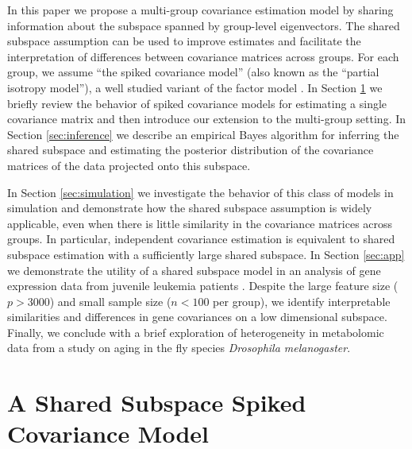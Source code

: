 \documentclass[12pt]{article}
\begin{document}
In this paper we propose a multi-group covariance estimation model by
sharing information about the subspace spanned by group-level
eigenvectors.  The shared subspace assumption can be used to improve
estimates and facilitate the interpretation of differences between
covariance matrices across groups.  For each group, we assume ``the
spiked covariance model'' (also known as the ``partial isotropy
model''), a well studied variant of the factor model
\citep{Mardia1980, Johnstone2001}.  In Section \ref{sec:shared} we
briefly review the behavior of spiked covariance models for estimating
a single covariance matrix and then introduce our extension to the
multi-group setting.  In Section \ref{sec:inference} we describe an
empirical Bayes algorithm for inferring the shared subspace and
estimating the posterior distribution of the covariance matrices of
the data projected onto this subspace.  

In Section \ref{sec:simulation} we investigate the behavior of this
class of models in simulation and demonstrate how the shared subspace
assumption is widely applicable, even when there is little similarity
in the covariance matrices across groups.  In particular, independent
covariance estimation is equivalent to shared subspace
estimation with a sufficiently large shared subspace.  In Section
\ref{sec:app} we demonstrate the utility of a shared subspace model in
an analysis of gene expression data from juvenile leukemia patients .
Despite the large feature size ($p > 3000$) and small sample size
($n < 100$ per group), we identify interpretable similarities and
differences in gene covariances on a low dimensional subspace.
Finally, we conclude with a brief exploration of heterogeneity in
metabolomic data from a study on aging in the fly species
\textit{Drosophila melanogaster}.

\section{A Shared Subspace Spiked Covariance Model}
\label{sec:shared}

\end{document}
